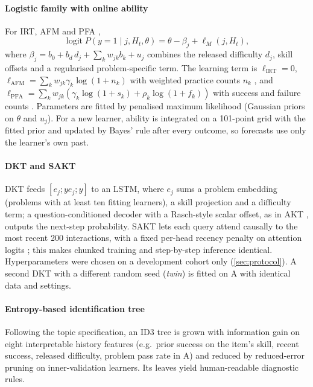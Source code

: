 \documentclass[a4paper,preprint,12pt,authoryear]{elsarticle}
\begin{document}
\paragraph{Logistic family with online ability} For IRT, AFM and PFA \citep[see][for an overview of this family]{pelanek2017learner},
\begin{equation}
\operatorname{logit} P(y=1\mid j,H_t,\theta) = \theta - \beta_j + \ell_M(j,H_t),
\label{eq:logistic}
\end{equation}
where $\beta_j = b_0 + b_d\,d_j + \sum_k w_{jk} b_k + u_j$ combines the released difficulty $d_j$, skill offsets and a regularised problem-specific term. The learning term is $\ell_{\mathrm{IRT}}=0$, $\ell_{\mathrm{AFM}}=\sum_k w_{jk}\gamma_k\log(1+n_k)$ with weighted practice counts $n_k$ \citep{cen2006lfa}, and $\ell_{\mathrm{PFA}}=\sum_k w_{jk}(\gamma_k\log(1+s_k)+\rho_k\log(1+f_k))$ with success and failure counts \citep{pavlik2009pfa}. Parameters are fitted by penalised maximum likelihood (Gaussian priors on $\theta$ and $u_j$). For a new learner, ability is integrated on a 101-point grid with the fitted prior and updated by Bayes' rule after every outcome, so forecasts use only the learner's own past.

\paragraph{DKT and SAKT} DKT \citep{piech2015dkt} feeds $[e_j; y e_j; y]$ to an LSTM, where $e_j$ sums a problem embedding (problems with at least ten fitting learners), a skill projection and a difficulty term; a question-conditioned decoder with a Rasch-style scalar offset, as in AKT \citep{ghosh2020akt}, outputs the next-step probability. SAKT \citep{pandey2019sakt} lets each query attend causally to the most recent 200 interactions, with a fixed per-head recency penalty on attention logits \citep{press2022alibi}; this makes chunked training and step-by-step inference identical. Hyperparameters were chosen on a development cohort only (\cref{sec:protocol}). A second DKT with a different random seed (\emph{twin}) is fitted on A with identical data and settings.

\paragraph{Entropy-based identification tree} Following the topic specification, an ID3 tree \citep{quinlan1986id3} is grown with information gain on eight interpretable history features (e.g.\ prior success on the item's skill, recent success, released difficulty, problem pass rate in A) and reduced by reduced-error pruning on inner-validation learners. Its leaves yield human-readable diagnostic rules.
\end{document}
